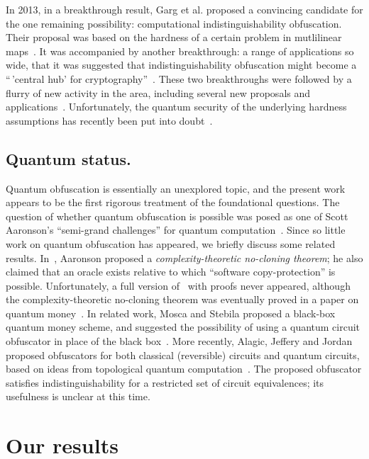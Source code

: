 \documentclass[11pt]{amsart}
\numberwithin{equation}{section}
\begin{document}
In 2013, in a breakthrough result, Garg et al. proposed a convincing candidate for the one remaining possibility: computational indistinguishability obfuscation. Their proposal was based on the hardness of a certain problem in mutlilinear maps~\cite{GGHRSW13}. It was accompanied by another breakthrough: a range of applications so wide, that it was suggested that indistinguishability obfuscation might become a ``\,'central hub' for cryptography''~\cite{SW14}. These two breakthroughs were followed by a flurry of new activity in the area, including several new proposals and applications~\cite{BGKPS14, BCCGKPR14, BZ14, BR14, GGHW14, HSW14}. Unfortunately, the quantum security of the underlying hardness assumptions has recently been put into doubt~\cite{Pei15}.

\subsection{Quantum status.} Quantum obfuscation is essentially an unexplored topic, and the present work appears to be the first rigorous treatment of the foundational questions. The question of whether quantum obfuscation is possible was posed as one of Scott Aaronson's ``semi-grand challenges'' for quantum computation~\cite{Aar05}. Since so little work on quantum obfuscation has appeared, we briefly discuss some related results. In~\cite{Aar09}, Aaronson proposed a \emph{complexity-theoretic no-cloning theorem}; he also claimed that an oracle exists relative to which ``software copy-protection'' is possible. Unfortunately, a full version of~\cite{Aar09} with proofs never appeared, although the complexity-theoretic no-cloning theorem was eventually proved in a paper on quantum money~\cite{AC12}. In related work, Mosca and Stebila proposed a black-box quantum money scheme, and suggested the possibility of using a quantum circuit obfuscator in place of the black box~\cite{MS10}. More recently, Alagic, Jeffery and Jordan proposed obfuscators for both classical (reversible) circuits and quantum circuits, based on ideas from topological quantum computation~\cite{ASS14}. The proposed obfuscator satisfies indistinguishability for a restricted set of circuit equivalences; its usefulness is unclear at this time.

\section{Our results}\label{sec:intro}
\end{document}
